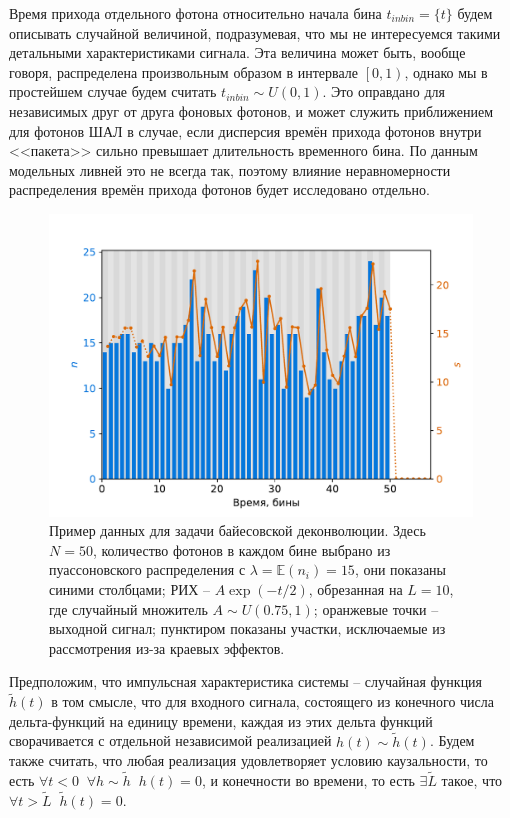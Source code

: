 \documentclass[12pt]{book}
\begin{document}
	Время прихода отдельного фотона относительно начала бина $t_{inbin} = \{ t \}$ будем описывать случайной величиной, подразумевая, что мы не интересуемся такими детальными характеристиками сигнала. Эта величина может быть, вообще говоря, распределена произвольным образом в интервале $\left[0, 1\right)$, однако мы в простейшем случае будем считать $t_{inbin} \sim U(0, 1)$. Это оправдано для независимых друг от друга фоновых фотонов, и может служить приближением для фотонов ШАЛ в случае, если дисперсия времён прихода фотонов внутри <<пакета>> сильно превышает длительность временного бина. По данным модельных ливней это не всегда так, поэтому влияние неравномерности распределения времён прихода фотонов будет исследовано отдельно.

	\begin{figure}[H]
		\centering
		\includegraphics[width=\columnwidth]{problem-setup-example}
		\caption{Пример данных для задачи байесовской деконволюции. Здесь $N = 50$, количество фотонов в каждом бине выбрано из пуассоновского распределения с $\lambda = \mathbb{E}(n_i) = 15$, они показаны синими столбцами; РИХ -- $A\exp(-t/2)$, обрезанная на $L = 10$, где случайный множитель $A \sim U(0.75, 1)$; оранжевые точки -- выходной сигнал; пунктиром показаны участки, исключаемые из рассмотрения из-за краевых эффектов.}
		\label{pic:problem-setup}
	\end{figure}

	Предположим, что импульсная характеристика системы -- случайная функция $\tilde{h}(t)$ в том смысле, что для входного сигнала, состоящего из конечного числа дельта-функций на единицу времени, каждая из этих дельта функций сворачивается с отдельной независимой реализацией $h(t) \sim \tilde{h}(t)$. Будем также считать, что любая реализация удовлетворяет условию каузальности, то есть $\forall t < 0 \; \; \forall h \sim \tilde{h} \; \; h(t) = 0$, и конечности во времени, то есть $\exists \tilde{L}$ такое, что $\forall t > \tilde{L} \; \; \tilde{h}(t) = 0$.
\end{document}
